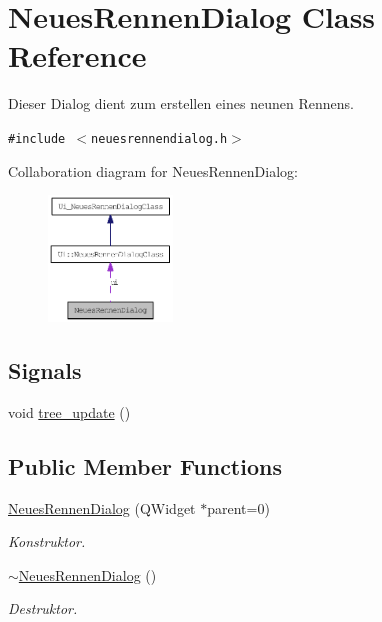 \hypertarget{class_neues_rennen_dialog}{
\section{NeuesRennenDialog Class Reference}
\label{class_neues_rennen_dialog}
}
Dieser Dialog dient zum erstellen eines neunen Rennens.  


{\tt \#include $<$neuesrennendialog.h$>$}

Collaboration diagram for NeuesRennenDialog:\nopagebreak
\begin{figure}[H]
\begin{center}
\leavevmode
\includegraphics[width=94pt]{class_neues_rennen_dialog__coll__graph}
\end{center}
\end{figure}
\subsection*{Signals}
\begin{CompactItemize}
\item 
void \hyperlink{class_neues_rennen_dialog_e4206541c7d04b36eec275243fb60d9c}{tree\_\-update} ()
\end{CompactItemize}
\subsection*{Public Member Functions}
\begin{CompactItemize}
\item 
\hyperlink{class_neues_rennen_dialog_93cf71a6e076a554db7db78134961bc0}{NeuesRennenDialog} (QWidget $\ast$parent=0)
\begin{CompactList}\small\item\em Konstruktor. \item\end{CompactList}\item 
\hyperlink{class_neues_rennen_dialog_366aac9dfe8ee1c463bbb71934a4f6e6}{$\sim$NeuesRennenDialog} ()
\begin{CompactList}\small\item\em Destruktor. \item\end{CompactList}\end{CompactItemize}
